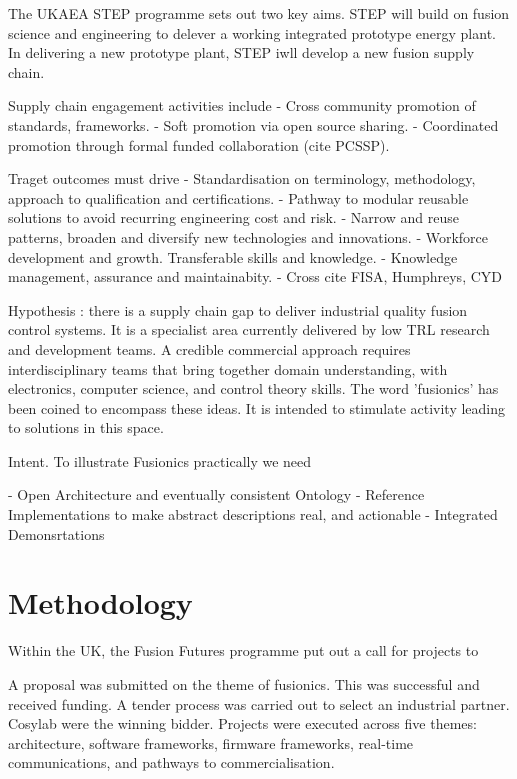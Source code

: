 \documentclass[preprint]{elsarticle}
\begin{document}
The UKAEA STEP programme sets out two key aims.  STEP will build on fusion science and engineering 
to delever a working integrated prototype energy plant. In delivering a new prototype plant, 
STEP iwll develop a new fusion supply chain.


Supply chain engagement activities include
- Cross community promotion of standards, frameworks.
- Soft promotion via open source sharing.
- Coordinated promotion through formal funded collaboration (cite PCSSP).


Traget outcomes must drive
- Standardisation on terminology, methodology, approach to qualification and certifications.
- Pathway to modular reusable solutions to avoid recurring engineering cost and risk.
- Narrow and reuse patterns, broaden and diversify new technologies and innovations. 
- Workforce development and growth. Transferable skills and knowledge.
- Knowledge management, assurance and maintainabity.
- Cross cite FISA, Humphreys, CYD

Hypothesis : there is a supply chain gap to deliver industrial quality fusion 
control systems.  It is a specialist area currently delivered by low TRL 
research and development teams.  A credible commercial approach requires 
interdisciplinary teams that bring together domain understanding, with
electronics, computer science, and control theory skills.
The word 'fusionics' has been coined to encompass these ideas.
It is intended to stimulate activity leading to solutions in this space.

Intent.  To illustrate Fusionics practically we need

- Open Architecture and eventually consistent Ontology
- Reference Implementations to make abstract descriptions real, and actionable
- Integrated Demonsrtations


\section{Methodology}

Within the UK, the Fusion Futures programme put out a call for projects to 

A proposal was submitted on the theme of fusionics.  This was successful and received funding.
A tender process was carried out to select an industrial partner.  Cosylab were the winning
bidder.  Projects were executed across five themes: architecture, software frameworks, firmware frameworks,
real-time communications, and pathways to commercialisation.
\end{document}
